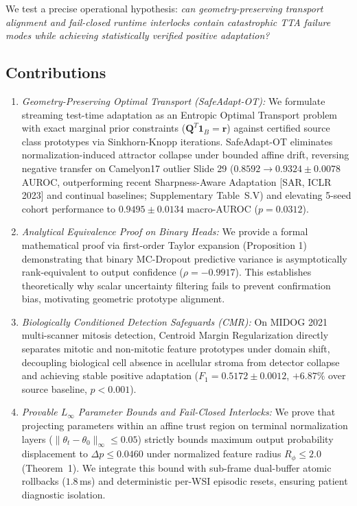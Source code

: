\documentclass[journal]{IEEEtran}
\begin{document}
We test a precise operational hypothesis: \emph{can geometry-preserving transport alignment and fail-closed runtime interlocks contain catastrophic TTA failure modes while achieving statistically verified positive adaptation?}

\subsection{Contributions}
\begin{enumerate}\setlength{\itemsep}{1pt}\setlength{\parskip}{0pt}
\item \textit{Geometry-Preserving Optimal Transport (SafeAdapt-OT):} We formulate streaming test-time adaptation as an Entropic Optimal Transport problem with exact marginal prior constraints ($\mathbf{Q}^T \mathbf{1}_B = \mathbf{r}$) against certified source class prototypes via Sinkhorn-Knopp iterations. SafeAdapt-OT eliminates normalization-induced attractor collapse under bounded affine drift, reversing negative transfer on Camelyon17 outlier Slide 29 ($0.8592 \to 0.9324 \pm 0.0078$ AUROC, outperforming recent Sharpness-Aware Adaptation [SAR, ICLR 2023] and continual baselines; Supplementary Table~S.V) and elevating 5-seed cohort performance to $0.9495 \pm 0.0134$ macro-AUROC ($p = 0.0312$).
\item \textit{Analytical Equivalence Proof on Binary Heads:} We provide a formal mathematical proof via first-order Taylor expansion (Proposition 1) demonstrating that binary MC-Dropout predictive variance is asymptotically rank-equivalent to output confidence ($\rho = -0.9917$). This establishes theoretically why scalar uncertainty filtering fails to prevent confirmation bias, motivating geometric prototype alignment.
\item \textit{Biologically Conditioned Detection Safeguards (CMR):} On MIDOG 2021 multi-scanner mitosis detection, Centroid Margin Regularization directly separates mitotic and non-mitotic feature prototypes under domain shift, decoupling biological cell absence in acellular stroma from detector collapse and achieving stable positive adaptation ($F_1 = 0.5172 \pm 0.0012$, $+6.87\%$ over source baseline, $p < 0.001$).
\item \textit{Provable $L_\infty$ Parameter Bounds and Fail-Closed Interlocks:} We prove that projecting parameters within an affine trust region on terminal normalization layers ($\|\theta_t - \theta_0\|_\infty \le 0.05$) strictly bounds maximum output probability displacement to $\Delta p \le 0.0460$ under normalized feature radius $R_\phi \le 2.0$ (Theorem~1). We integrate this bound with sub-frame dual-buffer atomic rollbacks ($1.8$\,ms) and deterministic per-WSI episodic resets, ensuring patient diagnostic isolation.

\end{enumerate}
\end{document}
